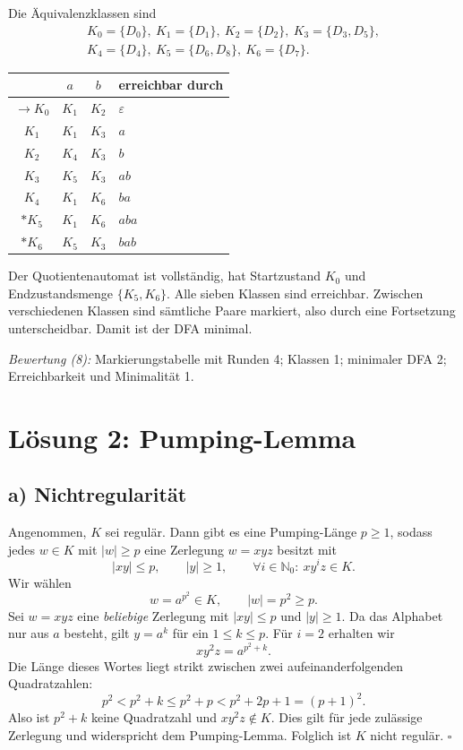 \documentclass[11pt,a4paper]{article}
\begin{document}
Die Äquivalenzklassen sind
\[
\begin{gathered}
K_0=\{D_0\},\ K_1=\{D_1\},\ K_2=\{D_2\},\ K_3=\{D_3,D_5\},\\
K_4=\{D_4\},\ K_5=\{D_6,D_8\},\ K_6=\{D_7\}.
\end{gathered}
\]
\begin{center}
\begin{tabular}{c|cc@{\qquad}l}
 & $a$ & $b$ & erreichbar durch\\\hline
$\to K_0$ & $K_1$ & $K_2$ & $\varepsilon$\\
$K_1$ & $K_1$ & $K_3$ & $a$\\
$K_2$ & $K_4$ & $K_3$ & $b$\\
$K_3$ & $K_5$ & $K_3$ & $ab$\\
$K_4$ & $K_1$ & $K_6$ & $ba$\\
$*K_5$ & $K_1$ & $K_6$ & $aba$\\
$*K_6$ & $K_5$ & $K_3$ & $bab$
\end{tabular}
\end{center}
Der Quotientenautomat ist vollständig, hat Startzustand $K_0$ und
Endzustandsmenge $\{K_5,K_6\}$. Alle sieben Klassen sind erreichbar.
Zwischen verschiedenen Klassen sind sämtliche Paare markiert, also durch
eine Fortsetzung unterscheidbar. Damit ist der DFA minimal.

\textit{Bewertung (8):} Markierungstabelle mit Runden 4; Klassen 1;
minimaler DFA 2; Erreichbarkeit und Minimalität 1.

\newpage
\section*{Lösung 2: Pumping-Lemma}
\subsection*{a) Nichtregularität}
Angenommen, $K$ sei regulär. Dann gibt es eine Pumping-Länge $p\geq1$,
sodass jedes $w\in K$ mit $|w|\geq p$ eine Zerlegung $w=xyz$ besitzt mit
\[
 |xy|\leq p,\qquad |y|\geq1,\qquad
 \forall i\in\mathbb N_0:\ xy^iz\in K.
\]
Wir wählen
\[
 w=a^{p^2}\in K,\qquad |w|=p^2\geq p.
\]
Sei $w=xyz$ eine \emph{beliebige} Zerlegung mit $|xy|\leq p$ und
$|y|\geq1$. Da das Alphabet nur aus $a$ besteht, gilt $y=a^k$ für ein
$1\leq k\leq p$. Für $i=2$ erhalten wir
\[
 xy^2z=a^{p^2+k}.
\]
Die Länge dieses Wortes liegt strikt zwischen zwei aufeinanderfolgenden
Quadratzahlen:
\[
 p^2<p^2+k\leq p^2+p<p^2+2p+1=(p+1)^2.
\]
Also ist $p^2+k$ keine Quadratzahl und $xy^2z\notin K$.
Dies gilt für jede zulässige Zerlegung und widerspricht dem Pumping-Lemma.
Folglich ist $K$ nicht regulär. \hfill$\square$
\end{document}

